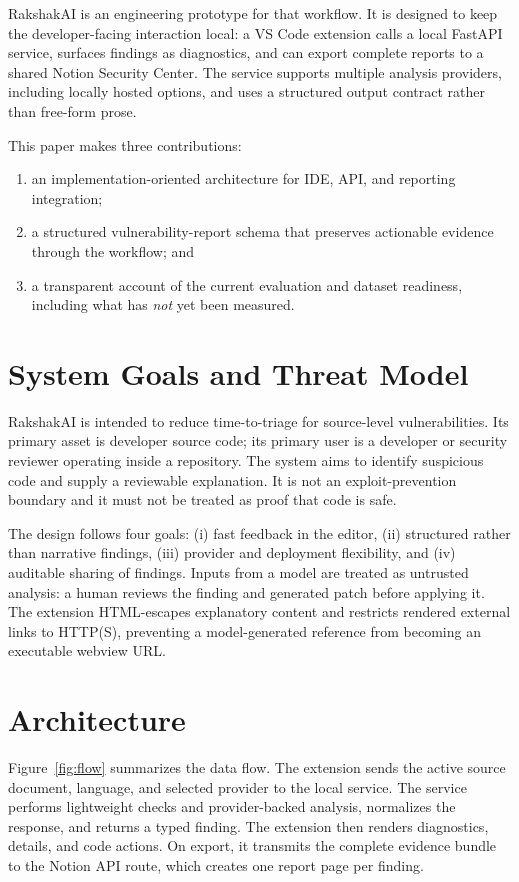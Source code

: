 \documentclass[10pt,conference]{IEEEtran}
\begin{document}
RakshakAI is an engineering prototype for that workflow. It is designed to keep the developer-facing interaction local: a VS Code extension calls a local FastAPI service, surfaces findings as diagnostics, and can export complete reports to a shared Notion Security Center. The service supports multiple analysis providers, including locally hosted options, and uses a structured output contract rather than free-form prose.

This paper makes three contributions:
\begin{enumerate}
  \item an implementation-oriented architecture for IDE, API, and reporting integration;
  \item a structured vulnerability-report schema that preserves actionable evidence through the workflow; and
  \item a transparent account of the current evaluation and dataset readiness, including what has \emph{not} yet been measured.
\end{enumerate}

\section{System Goals and Threat Model}
RakshakAI is intended to reduce time-to-triage for source-level vulnerabilities. Its primary asset is developer source code; its primary user is a developer or security reviewer operating inside a repository. The system aims to identify suspicious code and supply a reviewable explanation. It is not an exploit-prevention boundary and it must not be treated as proof that code is safe.

The design follows four goals: (i) fast feedback in the editor, (ii) structured rather than narrative findings, (iii) provider and deployment flexibility, and (iv) auditable sharing of findings. Inputs from a model are treated as untrusted analysis: a human reviews the finding and generated patch before applying it. The extension HTML-escapes explanatory content and restricts rendered external links to HTTP(S), preventing a model-generated reference from becoming an executable webview URL.

\section{Architecture}
Figure~\ref{fig:flow} summarizes the data flow. The extension sends the active source document, language, and selected provider to the local service. The service performs lightweight checks and provider-backed analysis, normalizes the response, and returns a typed finding. The extension then renders diagnostics, details, and code actions. On export, it transmits the complete evidence bundle to the Notion API route, which creates one report page per finding.
\end{document}
